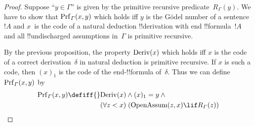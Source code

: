 \documentclass[../../../include/open-logic-section]{subfiles}
\begin{document}
\begin{proof}
Suppose ``$y \in \Gamma$'' is given by the primitive recursive
predicate~$R_\Gamma(y)$.  We have to show that $\Prf[\Gamma](x, y)$
which holds iff $y$ is the G\"odel number of a sentence~$!A$ and
$x$~is the code of a natural deduction !!{derivation} with end
!!{formula}~$!A$ and all !!{undischarged} assumptions in~$\Gamma$ is
primitive recursive.

By the previous proposition, the property $\mathrm{Deriv}(x)$ which holds
iff $x$ is the code of a correct derivation~$\delta$ in natural
deduction is primitive recursive. If $x$ is such a code, then $(x)_1$
is the code of the end-!!{formula} of~$\delta$. Thus we can define
$\Prf[\Gamma](x, y)$ by
\begin{align*}
\Prf[\Gamma](x, y) \defiff {} &
\fn{Deriv}(x) \land (x)_1 = y \land {} \\
& \bforall{z < x}{(\fn{OpenAssum}(z, x) \lif R_\Gamma(z))}
\end{align*}
\end{proof}
\end{document}
